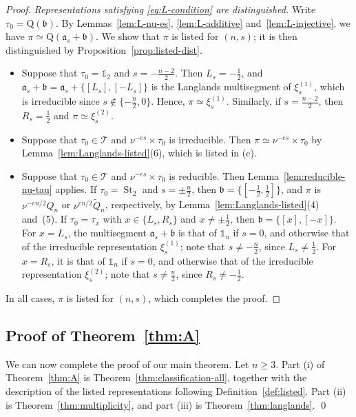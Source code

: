 \documentclass[11pt]{amsart}
\numberwithin{equation}{section}
\theoremstyle{plain}
\theoremstyle{definition}
\theoremstyle{remark}
\newcommand{\one}{\mathds{1}}
\newcommand{\T}{\mathcal{T}}
\DeclareMathOperator{\St}{St}
\newcommand{\Qt}{\widetilde{Q}}
\newcommand{\xione}{\xi^{(1)}}
\newcommand{\xitwo}{\xi^{(2)}}
\newcommand{\bb}{\mathfrak{b}}
\newcommand{\aaa}{\mathfrak{a}}
\newcommand{\Qq}{\mathrm{Q}}
\begin{document}
\begin{proof}
	\emph{Representations satisfying \eqref{eq:L-condition} are distinguished.} Write $\tau_0=\Qq(\bb)$. By Lemmas~\ref{lem:L-nu-es}, \ref{lem:L-additive} and~\ref{lem:L-injective}, we have $\pi\simeq\Qq(\aaa_s+\bb)$. We show that $\pi$ is listed for $(n,s)$; it is then distinguished by Proposition~\ref{prop:listed-dist}.
	\begin{itemize}
		\item Suppose that $\tau_0=\one_2$ and $s=-\frac{n-2}2$. Then $L_s=-\frac12$, and $\aaa_s+\bb=\aaa_s+\{[L_s],[-L_s]\}$ is the Langlands multisegment of $\xione_s$, which is irreducible since $s\notin\{-\frac n2,0\}$. Hence, $\pi\simeq\xione_s$. Similarly, if $s=\frac{n-2}2$, then $R_s=\frac12$ and $\pi\simeq\xitwo_s$.
		\item Suppose that $\tau_0\in\T$ and $\nu^{-es}\times\tau_0$ is irreducible. Then $\pi\simeq\nu^{-es}\times\tau_0$ by Lemma~\ref{lem:Langlands-listed}(6), which is listed in (c).
		\item Suppose that $\tau_0\in\T$ and $\nu^{-es}\times\tau_0$ is reducible. Then Lemma~\ref{lem:reducible-nu-tau} applies. If $\tau_0=\St_2$ and $s=\pm\frac n2$, then $\bb=\{[-\frac12,\frac12]\}$, and $\pi$ is $\nu^{-en/2}Q_n$ or $\nu^{en/2}\Qt_n$, respectively, by Lemma~\ref{lem:Langlands-listed}(4) and~(5). If $\tau_0=\tau_x$ with $x\in\{L_s,R_s\}$ and $x\ne\pm\frac12$, then $\bb=\{[x],[-x]\}$. For $x=L_s$, the multisegment $\aaa_s+\bb$ is that of $\one_n$ if $s=0$, and otherwise that of the irreducible representation $\xione_s$; note that $s\ne-\frac n2$, since $L_s\ne\frac12$. For $x=R_s$, it is that of $\one_n$ if $s=0$, and otherwise that of the irreducible representation $\xitwo_s$; note that $s\ne\frac n2$, since $R_s\ne-\frac12$.
	\end{itemize}
	In all cases, $\pi$ is listed for $(n,s)$, which completes the proof.
\end{proof}

\subsection{Proof of Theorem~\ref{thm:A}}\label{ss:proof-A}

We can now complete the proof of our main theorem. Let $n\ge3$. Part (i) of Theorem~\ref{thm:A} is Theorem~\ref{thm:classification-all}, together with the description of the listed representations following Definition~\ref{def:listed}. Part (ii) is Theorem~\ref{thm:multiplicity}, and part (iii) is Theorem~\ref{thm:langlands}. \qed
\end{document}
